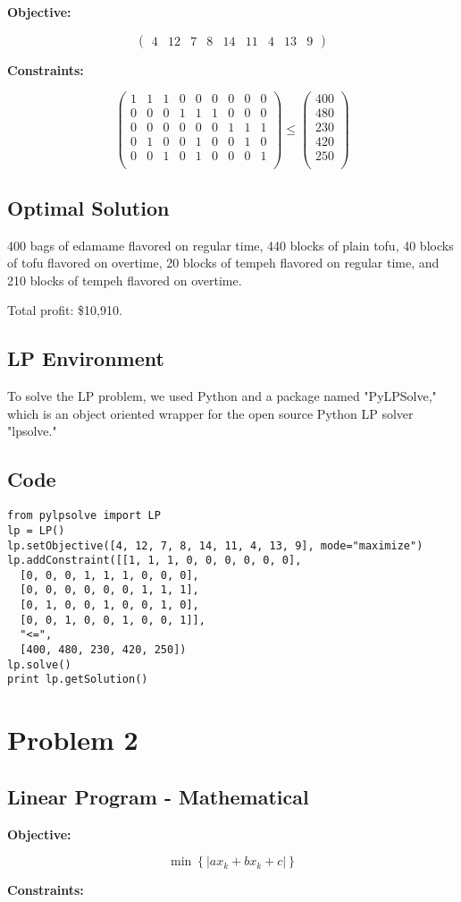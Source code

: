 \documentclass[12pt,letterpaper]{article}
\begin{document}
\textbf{Objective:}

\[ \left( \begin{array}{ccccccccc}
4 & 12 & 7 & 8 & 14 & 11 & 4 & 13 & 9 \end{array} \right)\]

\textbf{Constraints:}

\[ \left( \begin{array}{ccccccccc}
1 & 1 & 1 & 0 & 0 & 0 & 0 & 0 & 0 \\
0 & 0 & 0 & 1 & 1 & 1 & 0 & 0 & 0 \\
0 & 0 & 0 & 0 & 0 & 0 & 1 & 1 & 1 \\
0 & 1 & 0 & 0 & 1 & 0 & 0 & 1 & 0 \\
0 & 0 & 1 & 0 & 1 & 0 & 0 & 0 & 1 \\
\end{array} \right)
\leq
 \left( \begin{array}{c}
400 \\
480 \\
230 \\
420 \\
250 \\
\end{array} \right) \]

\subsection*{Optimal Solution}

400 bags of edamame flavored on regular time, 440 blocks of plain tofu, 40 blocks of tofu flavored on overtime, 20 blocks of tempeh flavored on regular time, and 210 blocks of tempeh flavored on overtime.

Total profit: \$10,910.

\subsection*{LP Environment}

To solve the LP problem, we used Python and a package named "PyLPSolve," which is an object oriented wrapper for the open source Python LP solver "lpsolve."

\subsection*{Code}

\begin{verbatim}
from pylpsolve import LP
lp = LP()
lp.setObjective([4, 12, 7, 8, 14, 11, 4, 13, 9], mode="maximize")
lp.addConstraint([[1, 1, 1, 0, 0, 0, 0, 0, 0],
  [0, 0, 0, 1, 1, 1, 0, 0, 0],
  [0, 0, 0, 0, 0, 0, 1, 1, 1],
  [0, 1, 0, 0, 1, 0, 0, 1, 0],
  [0, 0, 1, 0, 0, 1, 0, 0, 1]],
  "<=",
  [400, 480, 230, 420, 250])
lp.solve()
print lp.getSolution()
\end{verbatim}

\section*{Problem 2}

\subsection*{Linear Program - Mathematical}

\textbf{Objective:}


$$
\min \left \{ |ax_k+bx_k + c| \right \}
$$

\textbf{Constraints:}
\end{document}

